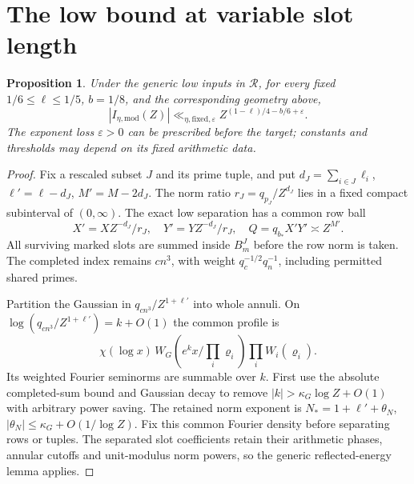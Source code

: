 \documentclass[11pt,a4paper]{article}
\newtheorem{proposition}[theorem]{Proposition}
\theoremstyle{definition}
\newcommand{\eps}{\varepsilon}
\begin{document}
\section{The low bound at variable slot length}
\label{sec:low}
\begin{proposition}\label{prop:low}
Under the generic low inputs in $\mathcal R$, for every fixed
$1/6\le\ell\le1/5$, $b=1/8$, and the corresponding geometry above,
\[
 |I_{\eta,\mathrm{mod}}(Z)|
 \ll_{\eta,\mathrm{fixed},\eps}
 Z^{(1-\ell)/4-b/6+\eps}.
\]
The exponent loss $\eps>0$ can be prescribed before the target;
constants and thresholds may depend on its fixed arithmetic data.
\end{proposition}
\begin{proof}
Fix a rescaled subset $J$ and its prime tuple, and put
$d_J=\sum_{i\in J}\ell_i$, $\ell'=\ell-d_J$, $M'=M-2d_J$.
The norm ratio $r_J=q_{p_J}/Z^{d_J}$ lies in a fixed compact
subinterval of $(0,\infty)$. The exact low separation has a common
row ball
\[
 X'=XZ^{-d_J}/r_J,\quad Y'=YZ^{-d_J}/r_J,\quad
 Q=q_{b_*}X'Y'\asymp Z^{M'}.
\]
All surviving marked slots are summed inside $B_m^J$ before the
row norm is taken. The completed index remains $cn^3$, with weight
$q_c^{-1/2}q_n^{-1}$, including permitted shared primes.

Partition the Gaussian in $q_{cn^3}/Z^{1+\ell'}$ into whole annuli.
On $\log(q_{cn^3}/Z^{1+\ell'})=k+O(1)$ the common profile is
\[
 \chi(\log x)\,
 W_G\!\left(e^kx/\prod_i\varrho_i\right)\prod_i W_i(\varrho_i).
\]
Its weighted Fourier seminorms are summable over $k$. First use
the absolute completed-sum bound and Gaussian decay to remove
$|k|>\kappa_G\log Z+O(1)$ with arbitrary power saving.
The retained norm exponent is
$N_*=1+\ell'+\theta_N$,
$|\theta_N|\le\kappa_G+O(1/\log Z)$.
Fix this common Fourier density before separating rows or tuples.
The separated slot coefficients retain their arithmetic phases,
annular cutoffs and unit-modulus norm powers, so the generic
reflected-energy lemma applies.


\end{proof}
\end{document}
